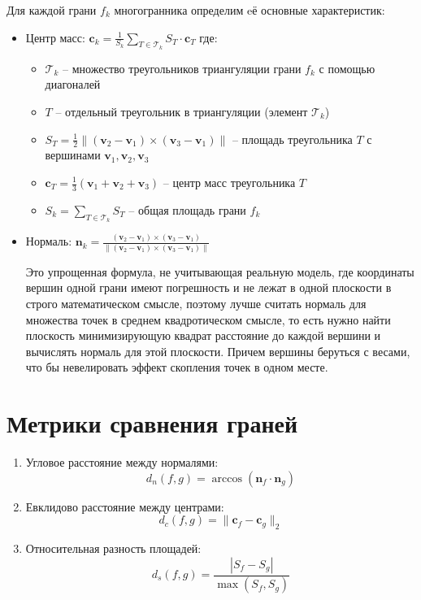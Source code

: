 \documentclass[a4paper,12pt]{article}
\begin{document}
Для каждой грани $f_k$ многогранника определим eё основные характеристик:
\begin{itemize}
    \item Центр масс: $\mathbf{c}_k = \frac{1}{S_k} \sum\limits_{T \in \mathcal{T}_k} S_T \cdot \mathbf{c}_T$
    \noindent где:
    \begin{itemize}
        \item $\mathcal{T}_k$ -- множество треугольников триангуляции грани $f_k$ с помощью диагоналей
        \item $T$ -- отдельный треугольник в триангуляции (элемент $\mathcal{T}_k$)
        \item $S_T = \frac{1}{2}\|(\mathbf{v}_2 - \mathbf{v}_1) \times (\mathbf{v}_3 - \mathbf{v}_1)\|$ -- площадь треугольника $T$ 
            с вершинами $\mathbf{v}_1, \mathbf{v}_2, \mathbf{v}_3$
        \item $\mathbf{c}_T = \frac{1}{3}(\mathbf{v}_1 + \mathbf{v}_2 + \mathbf{v}_3)$ -- центр масс треугольника $T$
        \item $S_k = \sum_{T \in \mathcal{T}_k} S_T$ -- общая площадь грани $f_k$
    \end{itemize}
    \item Нормаль: $\mathbf{n}_k = \frac{(\mathbf{v}_2 - \mathbf{v}_1) \times (\mathbf{v}_3 - \mathbf{v}_1)}{\|(\mathbf{v}_2 - \mathbf{v}_1) \times (\mathbf{v}_3 - \mathbf{v}_1)\|}$

Это упрощенная формула, не учитывающая реальную модель, где координаты вершин одной грани имеют погрешность и не лежат
в одной плоскости в строго математическом смысле, поэтому лучше считать нормаль для множества точек в среднем квадротическом смысле,
то есть нужно найти плоскость минимизирующую квадрат расстояние до каждой вершини и вычислять нормаль для этой плоскости.
Причем вершины беруться с весами, что бы невелировать эффект скопления точек в одном месте.
\end{itemize}

\section{Метрики сравнения граней}
\begin{enumerate}
    \item Угловое расстояние между нормалями:
    \begin{equation}
    d_n(f,g) = \arccos(\mathbf{n}_f \cdot \mathbf{n}_g)
    \end{equation}
    
    \item Евклидово расстояние между центрами:
    \begin{equation}
    d_c(f,g) = \|\mathbf{c}_f - \mathbf{c}_g\|_2
    \end{equation}
    
    \item Относительная разность площадей:
    \begin{equation}
    d_s(f,g) = \frac{|S_f - S_g|}{\max(S_f, S_g)}
    \end{equation}
\end{enumerate}
\end{document}
